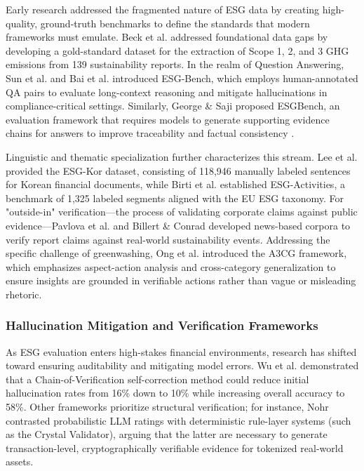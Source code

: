 \documentclass{article}
\begin{document}
Early research addressed the fragmented nature of ESG data by creating high-quality, ground-truth benchmarks to define the standards that modern frameworks must emulate. Beck et al.  \parencite{jacob_beck_9548a833} addressed foundational data gaps by developing a gold-standard dataset for the extraction of Scope 1, 2, and 3 GHG emissions from 139 sustainability reports. In the realm of Question Answering, Sun et al.  \parencite{siqi_sun_f6a51152} and Bai et al.  \parencite{association_for_artificial_intelligence_2026_86e12eae} introduced ESG-Bench, which employs human-annotated QA pairs to evaluate long-context reasoning and mitigate hallucinations in compliance-critical settings. Similarly, George \& Saji  \parencite{s__s__george_saji_b30d4b3e} proposed ESGBench, an evaluation framework that requires models to generate supporting evidence chains for answers to improve traceability and factual consistency  \parencite{s__s__george_saji_b30d4b3e}.

Linguistic and thematic specialization further characterizes this stream. Lee et al.  \parencite{jaeyoung_lee_1894333c} provided the ESG-Kor dataset, consisting of 118,946 manually labeled sentences for Korean financial documents, while Birti et al.  \parencite{mattia_birti_c097e3e8} established ESG-Activities, a benchmark of 1,325 labeled segments aligned with the EU ESG taxonomy. For "outside-in" verification—the process of validating corporate claims against public evidence—Pavlova et al.  \parencite{mariya_pavlova_259be499} and Billert \& Conrad  \parencite{fabian_billert_a5fbb687} developed news-based corpora to verify report claims against real-world sustainability events. Addressing the specific challenge of greenwashing, Ong et al.  \parencite{keane_ong_0a5de439} introduced the A3CG framework, which emphasizes aspect-action analysis and cross-category generalization to ensure insights are grounded in verifiable actions rather than vague or misleading rhetoric.
\subsubsection{Hallucination Mitigation and Verification Frameworks}

As ESG evaluation enters high-stakes financial environments, research has shifted toward ensuring auditability and mitigating model errors. Wu et al.  \parencite{yue_wu_cae353aa} demonstrated that a Chain-of-Verification self-correction method could reduce initial hallucination rates from 16\% down to 10\% while increasing overall accuracy to 58\%. Other frameworks prioritize structural verification; for instance, Nohr  \parencite{steven_paul_nohr_a6874924} contrasted probabilistic LLM ratings with deterministic rule-layer systems (such as the Crystal Validator), arguing that the latter are necessary to generate transaction-level, cryptographically verifiable evidence for tokenized real-world assets.
\end{document}
